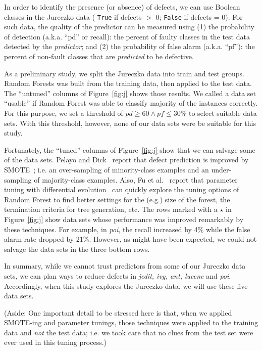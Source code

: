 \documentclass{sig-alternate}
\newcommand{\fig}[1]{Figure~\ref{fig:#1}}
\begin{document}
\begin{itemize}
In order to identify the presence (or absence) of defects, we can   use Boolean classes in the  Jureczko data ( \texttt{True} if defects $\gt$ 0; \texttt{False} if defects = 0). For such data, the quality of the predictor can be measured using (1) the  probability of detection (a.k.a. ``pd'' or recall):  the percent of faulty classes in the test data detected by the {\em predictor}; and (2) the  probability of false alarm (a.k.a. ``pf''): the percent of non-fault classes that are {\em predicted} to be defective.

As a preliminary study, we split the Jureczko  data into train and test groups. Random Forests was built from the training data, then applied to the test data. The ``untuned'' columns of \fig{j} shows those results. We called a data set ``usable'' if Random Forest was able to classify majority of the instances correctly. For this purpose, we set a threshold of $\mathit{pd}\ge 60 \wedge \mathit{pf} \le 30$\% to select suitable data sets. With this threshold, however, none of our data sets were be suitable for this study.

Fortunately, the ``tuned'' columns of \fig{j} show that we can salvage some of the data sets. Pelayo and Dick~\cite{pelayo07} report that defect prediction is improved by SMOTE~\cite{Chawla2002}; i.e. an over-sampling of minority-class examples and an under-sampling of majority-class examples. Also, Fu et al.~\cite{fu:ase15} report that parameter tuning with differential evolution~\cite{storn97} can quickly explore the tuning options of Random Forest to find better settings for the (e.g.) size of the forest, the termination criteria
for tree generation, etc. The rows \colorbox{celadon}{marked with a $\star$} in \fig{j} show data sets whose performance was improved remarkably by these techniques. For example, in {\em poi}, the recall increased by 4\% while the false alarm rate dropped by 21\%. However,  as might have been expected, we could not salvage the data sets in the  three bottom rows.

In summary, while we cannot trust predictors from some of our Jureczko data sets,
we can plan ways to reduce defects in {\em jedit, ivy, ant, lucene} and {\em poi}.
Accordingly, when this study explores the Jureczko data, we will use these five data sets.

(Aside: One important detail to be stressed here is that, when we applied    SMOTE-ing and
parameter tunings, those techniques were applied to the training data and {\em not}
the test data; i.e. we took care that no clues from the test set were ever used in this tuning process.)








\end{itemize}
\end{document}
